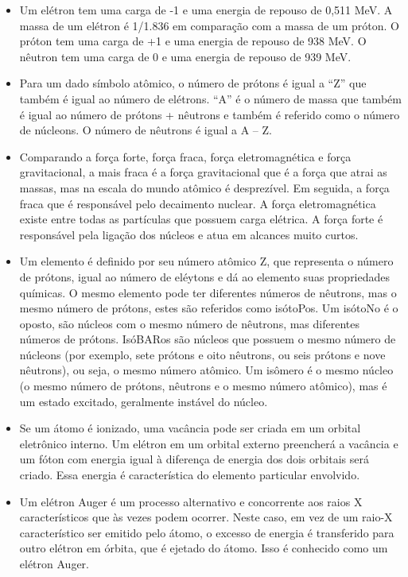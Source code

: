 \documentclass[11pt,a4paper]{article}
\newcounter{exemplo}
\begin{document}
\begin{exemplo}
\begin{itemize}
        \item Um elétron tem uma carga de -1 e uma energia de repouso de 0,511 MeV. A massa de um elétron é 1/1.836 em comparação com a massa de um próton. O próton tem uma carga de +1 e uma energia de repouso de 938 MeV. O nêutron tem uma carga de 0 e uma energia de repouso de 939 MeV.
        
        \item Para um dado símbolo atômico, o número de prótons é igual a “Z” que também é igual ao número de elétrons. “A” é o número de massa que também é igual ao número de prótons + nêutrons e também é referido como o número de núcleons. O número de nêutrons é igual a A – Z.
        
        \item Comparando a força forte, força fraca, força eletromagnética e força gravitacional, a mais fraca é a força gravitacional que é a força que atrai as massas, mas na escala do mundo atômico é desprezível. Em seguida, a força fraca que é responsável pelo decaimento nuclear. A força eletromagnética existe entre todas as partículas que possuem carga elétrica. A força forte é responsável pela ligação dos núcleos e atua em alcances muito curtos.
        
        \item Um elemento é definido por seu número atômico Z, que representa o número de prótons, igual ao número de eléytons e dá ao elemento suas propriedades químicas. O mesmo elemento pode ter diferentes números de nêutrons, mas o mesmo número de prótons, estes são referidos como isótoPos. Um isótoNo é o oposto, são núcleos com o mesmo número de nêutrons, mas diferentes números de prótons. IsóBARos são núcleos que possuem o mesmo número de núcleons (por exemplo, sete prótons e oito nêutrons, ou seis prótons e nove nêutrons), ou seja, o mesmo número atômico. Um isômero é o mesmo núcleo (o mesmo número de prótons, nêutrons e o mesmo número atômico), mas é um estado excitado, geralmente instável do núcleo.
        
        \item Se um átomo é ionizado, uma vacância pode ser criada em um orbital eletrônico interno. Um elétron em um orbital externo preencherá a vacância e um fóton com energia igual à diferença de energia dos dois orbitais será criado. Essa energia é característica do elemento particular envolvido.
        
        \item Um elétron Auger é um processo alternativo e concorrente aos raios X característicos que às vezes podem ocorrer. Neste caso, em vez de um raio-X característico ser emitido pelo átomo, o excesso de energia é transferido para outro elétron em órbita, que é ejetado do átomo. Isso é conhecido como um elétron Auger.
        

\end{itemize}
\end{exemplo}
\end{document}
